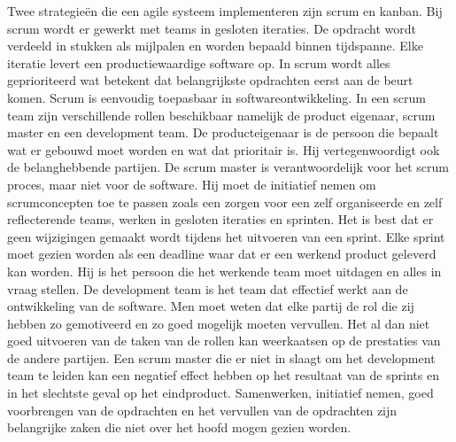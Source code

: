 \documentclass{hogent-article}
\begin{document}
   Twee strategieën die een agile systeem implementeren zijn scrum en kanban. Bij scrum wordt er gewerkt met teams in gesloten iteraties. De opdracht wordt verdeeld in stukken als mijlpalen en worden bepaald binnen tijdspanne. Elke iteratie levert een productiewaardige software op. In scrum wordt alles geprioriteerd wat betekent dat belangrijkste opdrachten eerst aan de beurt komen. Scrum is eenvoudig toepasbaar in softwareontwikkeling. In een scrum team zijn verschillende rollen beschikbaar namelijk de product eigenaar, scrum master en een development team. De producteigenaar is de persoon die bepaalt wat er gebouwd moet worden en wat dat prioritair is. Hij vertegenwoordigt ook de belanghebbende partijen. De scrum master is verantwoordelijk voor het scrum proces, maar niet voor de software. Hij moet de initiatief nemen om scrumconcepten toe te passen zoals een zorgen voor een zelf organiseerde en zelf reflecterende teams, werken in gesloten iteraties en sprinten. Het is best dat er geen wijzigingen gemaakt wordt tijdens het uitvoeren van een sprint. Elke sprint moet gezien worden als een deadline waar dat er een werkend product geleverd kan worden. Hij is het persoon die het werkende team moet uitdagen en alles in vraag stellen. De development team is het team dat effectief werkt aan de ontwikkeling van de software. Men moet weten dat elke partij de rol die zij hebben zo gemotiveerd en zo goed mogelijk moeten vervullen. Het al dan niet goed uitvoeren van de taken van de rollen kan weerkaatsen op de prestaties van de andere partijen. Een scrum master die er niet in slaagt om het development team te leiden kan een negatief effect hebben op het resultaat van de sprints en in het slechtste geval op het eindproduct. Samenwerken, initiatief nemen, goed voorbrengen van de opdrachten en het vervullen van de opdrachten zijn belangrijke zaken die niet over het hoofd mogen gezien worden.
   
\end{document}
